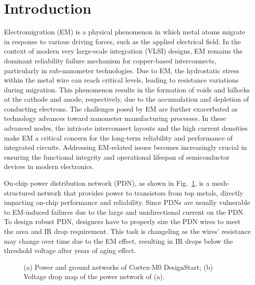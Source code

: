 \section{Introduction}
\label{sec:intro}
Electromigration (EM) is a physical phenomenon in which metal atoms migrate in response to various driving forces, such as the applied electrical field. In the context of modern very large-scale integration (VLSI) designs, EM remains the dominant reliability failure mechanism for copper-based interconnects, particularly in sub-nanometer technologies. Due to EM, the hydrostatic stress within the metal wire can reach critical levels, leading to resistance variations during migration. This phenomenon results in the formation of voids and hillocks at the cathode and anode, respectively, due to the accumulation and depletion of conducting electrons.
The challenges posed by EM are further exacerbated as technology advances toward nanometer manufacturing processes. In these advanced nodes, the intricate interconnect layouts and the high current densities make EM a critical concern for the long-term reliability and performance of integrated circuits. Addressing EM-related issues becomes increasingly crucial in ensuring the functional integrity and operational lifespan of semiconductor devices in modern electronics.


On-chip power distribution network (PDN), as shown in Fig.~\ref{fig:pgimage}, is a mesh-structured network that provides power to transistors from top metals, directly impacting on-chip performance and reliability. Since PDNs are usually vulnerable to EM-induced failures due to the large and unidirectional current on the PDN. To design robust PDN, designers have to properly size the PDN wires to meet the area and IR drop requirement. This task is changeling as the wires' resistance may change over time due to the EM effect, resulting in IR drops below the threshold voltage  after years of aging effect.
\begin{figure}[htp]
	\centering
	\caption{(a) Power and ground networks of Cortex-M0 DesignStart; (b) Voltage drop map of the power network of (a).}
	\label{fig:pgimage}
\end{figure}


